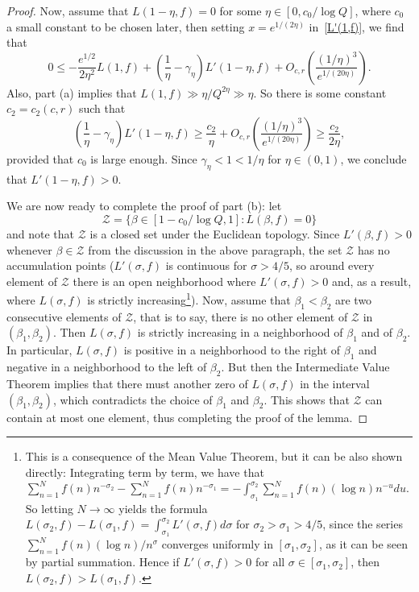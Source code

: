 \documentclass[12pt]{amsart}
\theoremstyle{remark}
\numberwithin{equation}{section}
\begin{document}
\begin{proof}
Now, assume that $L(1-\eta,f)=0$ for some $\eta\in[0,c_0/\log Q]$, where $c_0$ a small constant to be chosen later, then setting $x=e^{1/(2\eta)}$ in~\eqref{L'(1,f)}, we find that
\[
0\le -\frac{e^{1/2}}{2\eta^2}L(1,f)+\left(\frac1\eta-\gamma_\eta\right)L'(1-\eta,f)+O_{c,r}\left(\frac{(1/\eta)^3}{e^{1/(20\eta)}}\right).
\]
Also, part (a) implies that $L(1,f)\gg\eta/Q^{2\eta}\gg\eta$. So there is some constant $c_2=c_2(c,r)$ such that
\[
\left(\frac1\eta-\gamma_\eta\right)L'(1-\eta,f)\ge \frac{c_2}{\eta} + O_{c,r}\left(\frac{(1/\eta)^3}{e^{1/(20\eta)}}\right) \ge \frac{c_2}{2\eta},
\]
provided that $c_0$ is large enough. Since $\gamma_\eta<1<1/\eta$ for $\eta\in(0,1)$, we conclude that $L'(1-\eta,f)>0$.

We are now ready to complete the proof of part (b): let
\[
\mathscr{Z}=\{\beta\in[1-c_0/\log Q,1]:L(\beta,f)=0\}
\]
and note that $\mathscr{Z}$ is a closed set under the Euclidean topology. Since $L'(\beta,f)>0$ whenever $\beta\in \mathscr{Z}$ from the discussion in the above paragraph, the set $\mathscr{Z}$ has no accumulation points ($L'(\sigma,f)$ is continuous for $\sigma>4/5$, so around every element of $\mathscr{Z}$ there is an open neighborhood where $L'(\sigma,f)>0$ and, as a result, where $L(\sigma,f)$ is strictly increasing\footnote{This is a consequence of the Mean Value Theorem, but it can be also shown directly: Integrating term by term, we have that $\sum_{n=1}^Nf(n)n^{-\sigma_2}-\sum_{n=1}^Nf(n)n^{-\sigma_1} = -\int_{\sigma_1}^{\sigma_2}\sum_{n=1}^N f(n)(\log n)n^{-u}du$. So letting $N\to\infty$ yields the formula $L(\sigma_2,f)-L(\sigma_1,f) = \int_{\sigma_1}^{\sigma_2}L'(\sigma,f) d\sigma$ for $\sigma_2>\sigma_1>4/5$, since the series $\sum_{n=1}^Nf(n)(\log n)/n^\sigma$ converges uniformly in $[\sigma_1,\sigma_2]$, as it can be seen by partial summation. Hence if $L'(\sigma,f)>0$ for all $\sigma\in[\sigma_1,\sigma_2]$, then $L(\sigma_2,f)>L(\sigma_1,f)$.}). Now, assume that $\beta_1<\beta_2$ are two consecutive elements of $\mathscr{Z}$, that is to say, there is no other element of $\mathscr{Z}$ in $(\beta_1,\beta_2)$. Then $L(\sigma,f)$ is strictly increasing in a neighborhood of $\beta_1$ and of $\beta_2$. In particular, $L(\sigma,f)$ is positive in a neighborhood to the right of $\beta_1$ and negative in a neighborhood to the left of $\beta_2$. But then the Intermediate Value Theorem implies that there must another zero of $L(\sigma,f)$ in the interval $(\beta_1,\beta_2)$, which contradicts the choice of $\beta_1$ and $\beta_2$. This shows that $\mathscr{Z}$ can contain at most one element, thus completing the proof of the lemma.
\end{proof}
\end{document}
